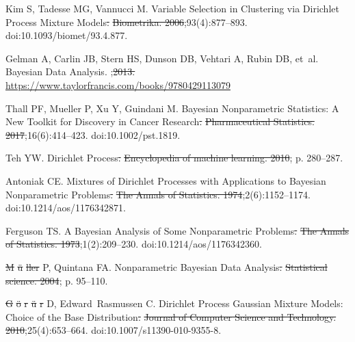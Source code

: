 \documentclass[10pt,letterpaper]{article}
\providecommand{\DIFaddtex}[1]{{\protect\color{blue}\uwave{#1}}} %
\providecommand{\DIFdeltex}[1]{{\protect\color{red}\sout{#1}}}                      %
\providecommand{\DIFaddbegin}{} %
\providecommand{\DIFaddend}{} %
\providecommand{\DIFdelbegin}{} %
\providecommand{\DIFdelend}{} %
\providecommand{\DIFadd}[1]{\texorpdfstring{\DIFaddtex{#1}}{#1}} %
\providecommand{\DIFdel}[1]{\texorpdfstring{\DIFdeltex{#1}}{}} %
\newcommand{\DIFscaledelfig}{0.5}
\newlength{\DIFdelgraphicswidth} %
\newlength{\DIFdelgraphicsheight} %
\newcommand{\DIFaddincludegraphics}[2][]{{\color{blue}\fbox{\DIFOincludegraphics[#1]{#2}}}} %
\newcommand{\DIFdelincludegraphics}[2][]{%
\sbox{\DIFdelgraphicsbox}{\DIFOincludegraphics[#1]{#2}}%
\settoboxwidth{\DIFdelgraphicswidth}{\DIFdelgraphicsbox} %
\settoboxtotalheight{\DIFdelgraphicsheight}{\DIFdelgraphicsbox} %
\scalebox{\DIFscaledelfig}{%
\parbox[b]{\DIFdelgraphicswidth}{\usebox{\DIFdelgraphicsbox}\\[-\baselineskip] \rule{\DIFdelgraphicswidth}{0em}}\llap{\resizebox{\DIFdelgraphicswidth}{\DIFdelgraphicsheight}{%
\setlength{\unitlength}{\DIFdelgraphicswidth}%
\begin{picture}(1,1)%
\thicklines\linethickness{2pt} %
{\color[rgb]{1,0,0}\put(0,0){\framebox(1,1){}}}%
{\color[rgb]{1,0,0}\put(0,0){\line( 1,1){1}}}%
{\color[rgb]{1,0,0}\put(0,1){\line(1,-1){1}}}%
\end{picture}%
}\hspace*{3pt}}} %
} %
\DeclareRobustCommand{\DIFaddbegin}{\DIFOaddbegin \let\includegraphics\DIFaddincludegraphics} %
\DeclareRobustCommand{\DIFaddend}{\DIFOaddend \let\includegraphics\DIFOincludegraphics} %
\DeclareRobustCommand{\DIFdelbegin}{\DIFOdelbegin \let\includegraphics\DIFdelincludegraphics} %
\DeclareRobustCommand{\DIFdelend}{\DIFOaddend \let\includegraphics\DIFOincludegraphics} %
\begin{document}
\begin{thebibliography}{10}
	Kim S, Tadesse MG, Vannucci M.
	\newblock Variable Selection in Clustering via {{Dirichlet}} Process Mixture
	Models\DIFdelbegin \DIFdel{.
	}%
\DIFdel{Biometrika. 2006}\DIFdelend ;93(4):877--893.
	\newblock doi:{10.1093/biomet/93.4.877}.

	Gelman A, Carlin JB, Stern HS, Dunson DB, Vehtari A, Rubin DB, et~al.
	\newblock Bayesian {{Data Analysis}}.
	;\DIFdelbegin \DIFdel{2013.
	}\DIFdelend \DIFaddbegin \DIFadd{.
	}\newblock \DIFadd{Available from:
	}\url{https://www.taylorfrancis.com/books/9780429113079}\DIFadd{.
	}\DIFaddend 

	Thall PF, Mueller P, Xu Y, Guindani M.
	\newblock Bayesian Nonparametric Statistics: {{A}} New Toolkit for Discovery in
	Cancer Research\DIFdelbegin \DIFdel{.
	}%
\DIFdel{Pharmaceutical Statistics. 2017}\DIFdelend ;16(6):414--423.
	\newblock doi:{10.1002/pst.1819}.

	Teh YW.
	\newblock Dirichlet Process\DIFdelbegin \DIFdel{.
	}%
\DIFdel{Encyclopedia of machine learning. 2010}\DIFdelend ; p. 280--287.

	Antoniak CE.
	\newblock Mixtures of {{Dirichlet Processes}} with {{Applications}} to
	{{Bayesian Nonparametric Problems}}\DIFdelbegin \DIFdel{.
	}%
\DIFdel{The Annals of Statistics. 1974}\DIFdelend ;2(6):1152--1174.
	\newblock doi:{10.1214/aos/1176342871}.

	Ferguson TS.
	\newblock A {{Bayesian Analysis}} of {{Some Nonparametric
			Problems}}\DIFdelbegin \DIFdel{.
	}%
\DIFdel{The Annals of Statistics. 1973}\DIFdelend ;1(2):209--230.
	\newblock doi:{10.1214/aos/1176342360}.

	\DIFdelbegin \DIFdel{M}%
\DIFdel{\"u}%
\DIFdel{ller }\DIFdelend \DIFaddbegin \DIFadd{Müller }\DIFaddend P, Quintana FA.
	\newblock Nonparametric Bayesian Data Analysis\DIFdelbegin \DIFdel{.
	}%
\DIFdel{Statistical science. 2004}\DIFdelend ; p. 95--110.

	\DIFdelbegin \DIFdel{G}%
\DIFdel{\"o}%
\DIFdel{r}%
\DIFdel{\"u}%
\DIFdel{r }\DIFdelend \DIFaddbegin \DIFadd{Görür }\DIFaddend D, Edward~Rasmussen C.
	\newblock Dirichlet {{Process Gaussian Mixture Models}}: {{Choice}} of the
	{{Base Distribution}}\DIFdelbegin \DIFdel{.
	}%
\DIFdel{Journal of Computer Science and Technology. 2010}\DIFdelend ;25(4):653--664.
	\newblock doi:{10.1007/s11390-010-9355-8}.


\end{thebibliography}
\end{document}
